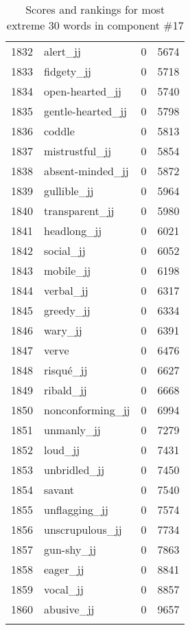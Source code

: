 \begin{longtable}[!htbp]{| rlr@{.}l |}
    1832 & alert\_jj & 0 & 5674 \\
    1833 & fidgety\_jj & 0 & 5718 \\
    1834 & open-hearted\_jj & 0 & 5740 \\
    1835 & gentle-hearted\_jj & 0 & 5798 \\
    1836 & coddle & 0 & 5813 \\
    1837 & mistrustful\_jj & 0 & 5854 \\
    1838 & absent-minded\_jj & 0 & 5872 \\
    1839 & gullible\_jj & 0 & 5964 \\
    1840 & transparent\_jj & 0 & 5980 \\
    1841 & headlong\_jj & 0 & 6021 \\
    1842 & social\_jj & 0 & 6052 \\
    1843 & mobile\_jj & 0 & 6198 \\
    1844 & verbal\_jj & 0 & 6317 \\
    1845 & greedy\_jj & 0 & 6334 \\
    1846 & wary\_jj & 0 & 6391 \\
    1847 & verve & 0 & 6476 \\
    1848 & risqué\_jj & 0 & 6627 \\
    1849 & ribald\_jj & 0 & 6668 \\
    1850 & nonconforming\_jj & 0 & 6994 \\
    1851 & unmanly\_jj & 0 & 7279 \\
    1852 & loud\_jj & 0 & 7431 \\
    1853 & unbridled\_jj & 0 & 7450 \\
    1854 & savant & 0 & 7540 \\
    1855 & unflagging\_jj & 0 & 7574 \\
    1856 & unscrupulous\_jj & 0 & 7734 \\
    1857 & gun-shy\_jj & 0 & 7863 \\
    1858 & eager\_jj & 0 & 8841 \\
    1859 & vocal\_jj & 0 & 8857 \\
    1860 & abusive\_jj & 0 & 9657 \\
    \hline
    \caption{Scores and rankings for most extreme 30 words in component \#17} \\
\end{longtable}
